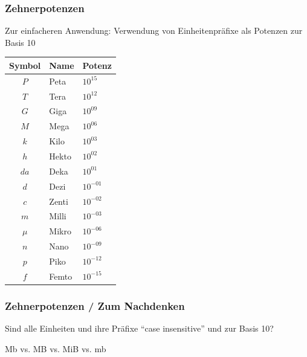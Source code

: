 \begin{frame}
  \frametitle{Zehnerpotenzen}

  Zur einfacheren Anwendung: Verwendung von Einheitenpräfixe als Potenzen zur Basis 10

  \begin{center}
    \footnotesize
    \begin{tabular}{|c|l|l|}\hline
      \textbf{Symbol} & \textbf{Name} & \textbf{Potenz} \\ \hline \hline
      $P$   & Peta  & $10^{15}$  \\ \hline
      $T$   & Tera  & $10^{12}$  \\ \hline
      $G$   & Giga  & $10^{09}$  \\ \hline
      $M$   & Mega  & $10^{06}$  \\ \hline
      $k$   & Kilo  & $10^{03}$  \\ \hline
      $h$   & Hekto & $10^{02}$  \\ \hline
      $da$  & Deka  & $10^{01}$  \\ \hline
      $d$   & Dezi  & $10^{-01}$ \\ \hline
      $c$   & Zenti & $10^{-02}$ \\ \hline
      $m$   & Milli & $10^{-03}$ \\ \hline
      $\mu$ & Mikro & $10^{-06}$ \\ \hline
      $n$   & Nano  & $10^{-09}$ \\ \hline
      $p$   & Piko  & $10^{-12}$ \\ \hline
      $f$   & Femto & $10^{-15}$ \\ \hline
    \end{tabular}
  \end{center}

\end{frame}

\begin{frame}
  \frametitle{Zehnerpotenzen / Zum Nachdenken}

  Sind alle Einheiten und ihre Präfixe ``case insensitive'' und zur Basis 10?

  \begin{block}{\begin{center}\Large Mb vs. MB vs. MiB vs. mb\end{center}}
  \end{block}

  \vspace{2em}



\end{frame}

